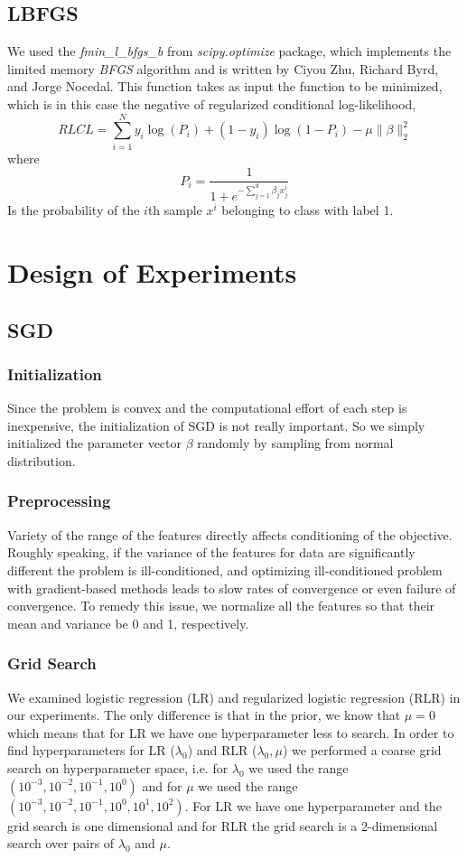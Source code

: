\documentclass[twoside,12pt]{article}
\begin{document}
\subsection{LBFGS}
We used the {\it fmin\_l\_bfgs\_b} from { \it scipy.optimize} package, which implements the limited memory {\it BFGS} algorithm and is written by Ciyou Zhu, Richard Byrd, and Jorge Nocedal. This function takes as input the function to be minimized, which is in this case the negative of regularized conditional log-likelihood,
\begin{equation}
RLCL = \sum_{i=1}^N y_i \log(P_i) + (1-y_i)\log(1 - P_i) - \mu \|\beta\|_2^2
\end{equation}
where 
\begin{equation}
P_i = \frac{1}{1+e^{-\sum_{j=1}^d \beta_j x^i_j}}
\end{equation}
Is the probability of the $i$th sample $x^i$ belonging to class with label 1. 
\section{Design of Experiments}
\subsection{SGD}
\subsubsection{Initialization}
Since the problem is convex and the computational effort of each step is inexpensive, the initialization of SGD is not really important. So we simply initialized the parameter vector $\beta$ randomly by sampling from normal distribution. 

\subsubsection{Preprocessing}
Variety of the range of the features directly affects conditioning of the objective. Roughly speaking, if the variance of the features for data are significantly different the problem is ill-conditioned, and optimizing ill-conditioned problem with gradient-based methods leads to slow rates of convergence or even failure of convergence. To remedy this issue, we normalize all the features so that their mean and variance be 0 and 1, respectively.

\subsubsection{Grid Search}
We examined logistic regression (LR) and regularized logistic regression (RLR) in our experiments. The only difference is that in the prior, we know that $\mu=0$ which means that for LR we have one hyperparameter less to search. In order to find hyperparameters for LR ($\lambda_0$) and RLR ($\lambda_0,\mu$) we performed a coarse grid search on hyperparameter space, i.e. for $\lambda_0$ we used the range $(10^{-3}, 10^{-2}, 10^{-1}, 10^{0})$ and for $\mu$ we used the range $(10^{-3}, 10^{-2}, 10^{-1}, 10^{0}, 10^{1}, 10^{2} )$. For LR we have one hyperparameter and the grid search is one dimensional and for RLR the grid search is a 2-dimensional search over pairs of $\lambda_0 $ and $\mu$.
\end{document}
